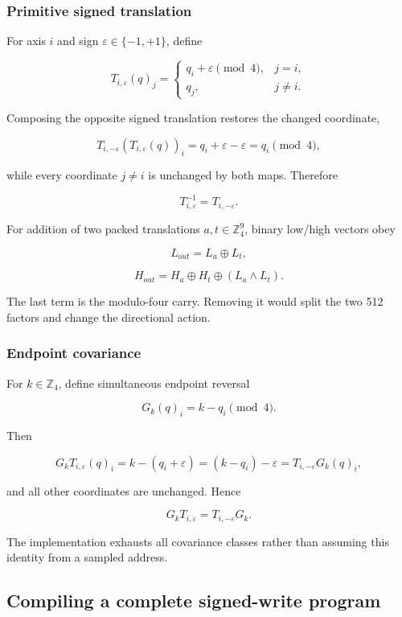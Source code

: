 \subsubsection{Primitive signed
translation}\label{viii-ch04-primitive-signed-translation}

For axis \(i\) and sign \(\varepsilon\in\{-1,+1\}\), define

\[
T_{i,\varepsilon}(q)_j=
\begin{cases}
q_i+\varepsilon\pmod4,&j=i,\\
q_j,&j\ne i.
\end{cases}
\]

Composing the opposite signed translation restores the changed
coordinate,

\[
T_{i,-\varepsilon}(T_{i,\varepsilon}(q))_i
=q_i+\varepsilon-\varepsilon=q_i\pmod 4,
\]

while every coordinate \(j\ne i\) is unchanged by both maps. Therefore

\[
T_{i,\varepsilon}^{-1}=T_{i,-\varepsilon}.
\]

For addition of two packed translations \(a,t\in\mathbb Z_4^9\), binary
low/high vectors obey

\[
L_{out}=L_a\oplus L_t,
\]

\[
H_{out}=H_a\oplus H_t\oplus(L_a\wedge L_t).
\]

The last term is the modulo-four carry. Removing it would split the two
512 factors and change the directional action.

\subsubsection{Endpoint covariance}\label{viii-ch04-endpoint-covariance}

For \(k\in\mathbb Z_4\), define simultaneous endpoint reversal

\[
G_k(q)_i=k-q_i\pmod4.
\]

Then

\[
G_kT_{i,\varepsilon}(q)_i
=k-(q_i+\varepsilon)
=(k-q_i)-\varepsilon
=T_{i,-\varepsilon}G_k(q)_i,
\]

and all other coordinates are unchanged. Hence

\[
G_kT_{i,\varepsilon}=T_{i,-\varepsilon}G_k.
\]

The implementation exhausts all covariance classes rather than assuming
this identity from a sampled address.

\subsection{Compiling a complete signed-write
program}\label{viii-ch04-compiling-a-complete-signed-write-program}

